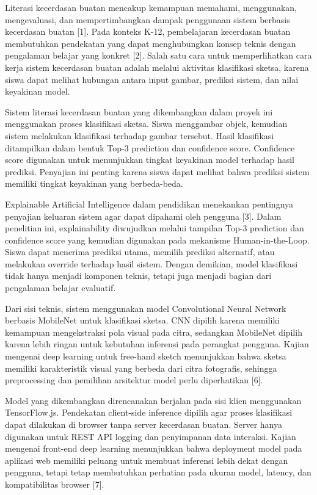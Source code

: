 \documentclass[12pt,oneside]{report}
\begin{document}
Literasi kecerdasan buatan mencakup kemampuan memahami, menggunakan, mengevaluasi, dan mempertimbangkan dampak penggunaan sistem berbasis kecerdasan buatan [1]. Pada konteks K-12, pembelajaran kecerdasan buatan membutuhkan pendekatan yang dapat menghubungkan konsep teknis dengan pengalaman belajar yang konkret [2]. Salah satu cara untuk memperlihatkan cara kerja sistem kecerdasan buatan adalah melalui aktivitas klasifikasi sketsa, karena siswa dapat melihat hubungan antara input gambar, prediksi sistem, dan nilai keyakinan model.

Sistem literasi kecerdasan buatan yang dikembangkan dalam proyek ini menggunakan proses klasifikasi sketsa. Siswa menggambar objek, kemudian sistem melakukan klasifikasi terhadap gambar tersebut. Hasil klasifikasi ditampilkan dalam bentuk Top-3 prediction dan confidence score. Confidence score digunakan untuk menunjukkan tingkat keyakinan model terhadap hasil prediksi. Penyajian ini penting karena siswa dapat melihat bahwa prediksi sistem memiliki tingkat keyakinan yang berbeda-beda.

Explainable Artificial Intelligence dalam pendidikan menekankan pentingnya penyajian keluaran sistem agar dapat dipahami oleh pengguna [3]. Dalam penelitian ini, explainability diwujudkan melalui tampilan Top-3 prediction dan confidence score yang kemudian digunakan pada mekanisme Human-in-the-Loop. Siswa dapat menerima prediksi utama, memilih prediksi alternatif, atau melakukan override terhadap hasil sistem. Dengan demikian, model klasifikasi tidak hanya menjadi komponen teknis, tetapi juga menjadi bagian dari pengalaman belajar evaluatif.

Dari sisi teknis, sistem menggunakan model Convolutional Neural Network berbasis MobileNet untuk klasifikasi sketsa. CNN dipilih karena memiliki kemampuan mengekstraksi pola visual pada citra, sedangkan MobileNet dipilih karena lebih ringan untuk kebutuhan inferensi pada perangkat pengguna. Kajian mengenai deep learning untuk free-hand sketch menunjukkan bahwa sketsa memiliki karakteristik visual yang berbeda dari citra fotografis, sehingga preprocessing dan pemilihan arsitektur model perlu diperhatikan [6].

Model yang dikembangkan direncanakan berjalan pada sisi klien menggunakan TensorFlow.js. Pendekatan client-side inference dipilih agar proses klasifikasi dapat dilakukan di browser tanpa server kecerdasan buatan. Server hanya digunakan untuk REST API logging dan penyimpanan data interaksi. Kajian mengenai front-end deep learning menunjukkan bahwa deployment model pada aplikasi web memiliki peluang untuk membuat inferensi lebih dekat dengan pengguna, tetapi tetap membutuhkan perhatian pada ukuran model, latency, dan kompatibilitas browser [7].
\end{document}
